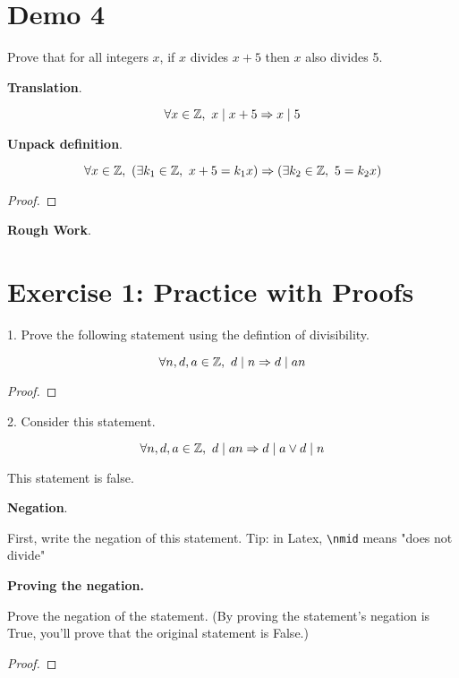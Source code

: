 \documentclass[14pt]{article}
\begin{document}
\newpage
\section*{Demo 4}

Prove that for all integers $x$,
if $x$ divides $x + 5$ then $x$ also divides 5.

\textbf{Translation}.

$$\forall x \in \mathbb{Z},~ x \mid x + 5 \Rightarrow x \mid 5$$

\textbf{Unpack definition}.

$$
\forall x \in \mathbb{Z},~
(\exists k_1 \in \mathbb{Z},~ x + 5 = k_1 x) \Rightarrow
(\exists k_2 \in \mathbb{Z},~ 5 = k_2 x)
$$

\begin{proof}
\end{proof}

\textbf{Rough Work}.

\newpage
\section*{Exercise 1: Practice with Proofs}

1. Prove the following statement using the defintion of divisibility.

$$\forall n, d, a \in \mathbb{Z},~ d \mid n \Rightarrow d \mid an$$

\begin{proof}
\end{proof}

\newpage

2. Consider this statement.

$$\forall n, d, a \in \mathbb{Z},~ d \mid an \Rightarrow d \mid a \lor d \mid n$$

This statement is false.



\textbf{Negation}.

First, write the negation of this statement.
Tip: in Latex, \verb|\nmid| means "does not divide"


\textbf{Proving the negation.}

Prove the negation of the statement. (By proving the statement’s negation is True, you’ll prove that the original statement is False.)

\begin{proof}
\end{proof}
\end{document}
